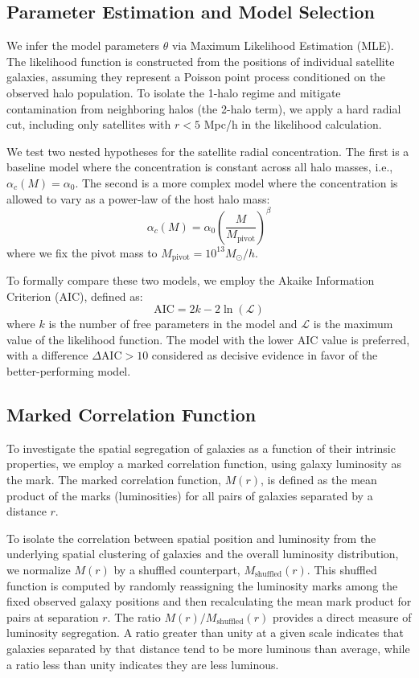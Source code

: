 \documentclass[]{article}
\begin{document}
\subsection{Parameter Estimation and Model Selection}
We infer the model parameters $\theta$ via Maximum Likelihood Estimation (MLE). The likelihood function is constructed from the positions of individual satellite galaxies, assuming they represent a Poisson point process conditioned on the observed halo population. To isolate the 1-halo regime and mitigate contamination from neighboring halos (the 2-halo term), we apply a hard radial cut, including only satellites with $r < 5$ Mpc/h in the likelihood calculation.

We test two nested hypotheses for the satellite radial concentration. The first is a baseline model where the concentration is constant across all halo masses, i.e., $\alpha_c(M) = \alpha_0$. The second is a more complex model where the concentration is allowed to vary as a power-law of the host halo mass:
\begin{equation}
\alpha_c(M) = \alpha_0 \left( \frac{M}{M_{\text{pivot}}} \right)^{\beta}
\end{equation}
where we fix the pivot mass to $M_{\text{pivot}} = 10^{13} M_\odot/h$.

To formally compare these two models, we employ the Akaike Information Criterion (AIC), defined as:
\begin{equation}
\text{AIC} = 2k - 2\ln(\mathcal{L})
\end{equation}
where $k$ is the number of free parameters in the model and $\mathcal{L}$ is the maximum value of the likelihood function. The model with the lower AIC value is preferred, with a difference $\Delta \text{AIC} > 10$ considered as decisive evidence in favor of the better-performing model.

\subsection{Marked Correlation Function}
To investigate the spatial segregation of galaxies as a function of their intrinsic properties, we employ a marked correlation function, using galaxy luminosity as the mark. The marked correlation function, $M(r)$, is defined as the mean product of the marks (luminosities) for all pairs of galaxies separated by a distance $r$.

To isolate the correlation between spatial position and luminosity from the underlying spatial clustering of galaxies and the overall luminosity distribution, we normalize $M(r)$ by a shuffled counterpart, $M_{\text{shuffled}}(r)$. This shuffled function is computed by randomly reassigning the luminosity marks among the fixed observed galaxy positions and then recalculating the mean mark product for pairs at separation $r$. The ratio $M(r)/M_{\text{shuffled}}(r)$ provides a direct measure of luminosity segregation. A ratio greater than unity at a given scale indicates that galaxies separated by that distance tend to be more luminous than average, while a ratio less than unity indicates they are less luminous.
\end{document}
